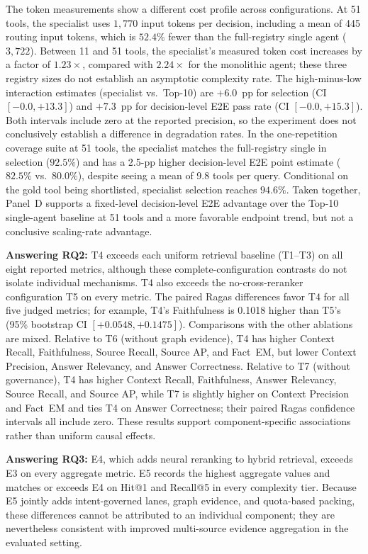The token measurements show a different cost profile across configurations. At 51 tools, the specialist uses $1{,}770$ input tokens per decision, including a mean of 445 routing input tokens, which is $52.4\%$ fewer than the full-registry single agent ($3{,}722$). Between 11 and 51 tools, the specialist's measured token cost increases by a factor of $1.23\times$, compared with $2.24\times$ for the monolithic agent; these three registry sizes do not establish an asymptotic complexity rate. The high-minus-low interaction estimates (specialist vs.\ Top-10) are $+6.0$~pp for selection (CI $[-0.0,+13.3]$) and $+7.3$~pp for decision-level E2E pass rate (CI $[-0.0,+15.3]$). Both intervals include zero at the reported precision, so the experiment does not conclusively establish a difference in degradation rates. In the one-repetition coverage suite at 51 tools, the specialist matches the full-registry single in selection ($92.5\%$) and has a 2.5-pp higher decision-level E2E point estimate ($82.5\%$ vs.\ $80.0\%$), despite seeing a mean of 9.8 tools per query. Conditional on the gold tool being shortlisted, specialist selection reaches $94.6\%$. Taken together, Panel~D supports a fixed-level decision-level E2E advantage over the Top-10 single-agent baseline at 51 tools and a more favorable endpoint trend, but not a conclusive scaling-rate advantage.

\textbf{Answering RQ2:} T4 exceeds each uniform retrieval baseline (T1--T3) on all eight reported metrics, although these complete-configuration contrasts do not isolate individual mechanisms. T4 also exceeds the no-cross-reranker configuration T5 on every metric. The paired Ragas differences favor T4 for all five judged metrics; for example, T4's Faithfulness is 0.1018 higher than T5's (95\% bootstrap CI $[+0.0548,+0.1475]$). Comparisons with the other ablations are mixed. Relative to T6 (without graph evidence), T4 has higher Context Recall, Faithfulness, Source Recall, Source AP, and Fact~EM, but lower Context Precision, Answer Relevancy, and Answer Correctness. Relative to T7 (without governance), T4 has higher Context Recall, Faithfulness, Answer Relevancy, Source Recall, and Source AP, while T7 is slightly higher on Context Precision and Fact~EM and ties T4 on Answer Correctness; their paired Ragas confidence intervals all include zero. These results support component-specific associations rather than uniform causal effects.

\textbf{Answering RQ3:} E4, which adds neural reranking to hybrid retrieval, exceeds E3 on every aggregate metric. E5 records the highest aggregate values and matches or exceeds E4 on Hit@1 and Recall@5 in every complexity tier. Because E5 jointly adds intent-governed lanes, graph evidence, and quota-based packing, these differences cannot be attributed to an individual component; they are nevertheless consistent with improved multi-source evidence aggregation in the evaluated setting.

